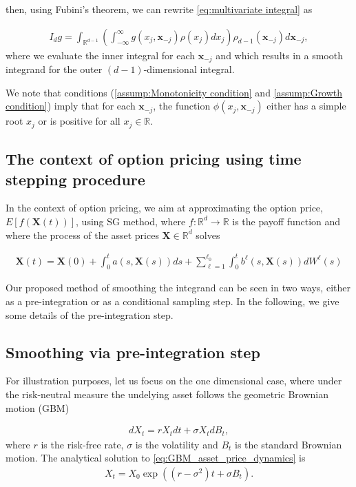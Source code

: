 \documentclass[11pt]{article}
\newcommand{\rset}{\mathbb{R}}
\newcommand{\PERIOD}{.}
\newcommand{\COMMA}{,}
\begin{document}
then, using Fubini's theorem,  we can rewrite \eqref{eq:multivariate integral} as

\begin{align}\label{eq:multivariate integral with smoothing}
I_d g = \int_{\rset^{d-1}} \left(\int_{-\infty}^\infty g(x_j,\mathbf{x}_{-j}) \rho(x_j) dx_j  \right) \rho_{d-1}(\mathbf{x}_{-j}) d\mathbf{x}_{-j}\COMMA	
\end{align}
where we evaluate the inner integral for each $\mathbf{x}_{-j}$ and which results in a smooth integrand for the outer $(d-1)$-dimensional integral.


We note that  conditions (\eqref{assump:Monotonicity condition} and \eqref{assump:Growth condition}) imply that for each $\mathbf{x}_{-j}$, the function $\phi(x_j,\mathbf{x}_{-j})$ either has a simple  root $x_j$ or is positive for all $x_j \in \rset$.

\subsection{The context of option pricing using time stepping procedure}

In the context of option pricing, we aim at approximating the option price, $E[f(\mathbf{X}(t))]$, using SG method,  where $f:\mathbb{R}^d  \rightarrow \mathbb{R}$ is the payoff function  and where  the process of the asset prices $\mathbf{X} \in \mathbb{R}^d$ solves 

\begin{align}
	\mathbf{X}(t)=\mathbf{X}(0)+ \int_{0}^{t} a(s,\mathbf{X}(s)) ds + \sum_{\ell=1}^{\ell_0} \int_{0}^{t} b^{\ell}(s,\mathbf{X}(s)) dW^{\ell}(s)
\end{align}

Our proposed method of smoothing the integrand can be seen in two ways, either as a pre-integration or as a conditional sampling step. In the following, we give some details of the  pre-integration step.
\subsection{Smoothing via pre-integration step}
For illustration purposes, let us focus on the one dimensional case, where under the risk-neutral measure the undelying asset follows the geometric Brownian motion (GBM)

\begin{align}\label{eq:GBM_asset_price_dynamics}
dX_t= r X_t dt+\sigma X_t dB_t \COMMA 
\end{align}
		where $r$ is the risk-free rate, $\sigma$ is the volatility and $B_t$ is the standard Brownian motion. The analytical solution to  \eqref{eq:GBM_asset_price_dynamics} is 
\begin{align}\label{eq:GBM_asset_price_analytic_sol}
	X_t=  X_0 \exp(( r-\sigma^2) t+\sigma B_t) \PERIOD
\end{align}
\end{document}
